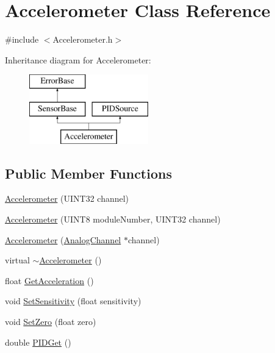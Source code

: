\hypertarget{classAccelerometer}{
\section{Accelerometer Class Reference}
\label{classAccelerometer}
}


{\ttfamily \#include $<$Accelerometer.h$>$}

Inheritance diagram for Accelerometer:\begin{figure}[H]
\begin{center}
\leavevmode
\includegraphics[height=3.000000cm]{classAccelerometer}
\end{center}
\end{figure}
\subsection*{Public Member Functions}
\begin{DoxyCompactItemize}
\item 
\hyperlink{classAccelerometer_a39b9a1d97af754f9e65d38e20fc7d4c6}{Accelerometer} (UINT32 channel)
\item 
\hyperlink{classAccelerometer_a4a7005c25c8b1b20ae725b5808ab9bff}{Accelerometer} (UINT8 moduleNumber, UINT32 channel)
\item 
\hyperlink{classAccelerometer_a69cce3af6adfffca56d41dd4ff6c3a3a}{Accelerometer} (\hyperlink{classAnalogChannel}{AnalogChannel} $\ast$channel)
\item 
virtual \hyperlink{classAccelerometer_acb6a7d9c61f2084ec4aec4a8ff35d622}{$\sim$Accelerometer} ()
\item 
float \hyperlink{classAccelerometer_a9a898749542f5338504895fc4debbf95}{GetAcceleration} ()
\item 
void \hyperlink{classAccelerometer_ad34599b5f2dbd1cd62de2c05b4d8e430}{SetSensitivity} (float sensitivity)
\item 
void \hyperlink{classAccelerometer_aa769546f0fd9e93a25e8f696102ff8dd}{SetZero} (float zero)
\item 
double \hyperlink{classAccelerometer_a4842f8338d2bb3922d8d8d793584d626}{PIDGet} ()
\end{DoxyCompactItemize}


